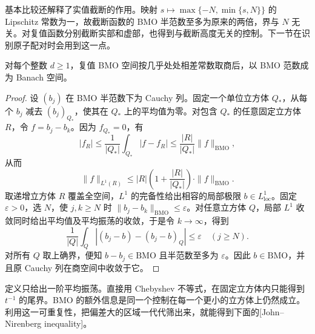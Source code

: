 \ProseParagraphBreak

基本比较还解释了实值截断的作用。映射 \(s\mapsto\max\{-N,\min\{s,N\}\}\) 的 Lipschitz 常数为一，故截断函数的 BMO 半范数至多为原来的两倍，界与 \(N\) 无关。对复值函数分别截断实部和虚部，也得到与截断高度无关的控制。下一节在识别原子配对时会用到这一点。

\begin{proposition}[模常数后的完备性]\label{b2:prop:C-bmo-complete}
对每个整数 \(d\geq1\)，复值 BMO 空间按几乎处处相差常数取商后，以 BMO 范数成为 Banach 空间。
\end{proposition}
\begin{proof}
设 \((b_j)\) 在 BMO 半范数下为 Cauchy 列。固定一个单位立方体 \(Q_*\)，从每个 \(b_j\) 减去 \((b_j)_{Q_*}\)，使其在 \(Q_*\) 上的平均值为零。对包含 \(Q_*\) 的任意固定立方体 \(R\)，令 \(f=b_j-b_k\)。因为 \(f_{Q_*}=0\)，有
\[
 |f_R|\leq\frac1{|Q_*|}\int_{Q_*}|f-f_R|
 \leq\frac{|R|}{|Q_*|}\|f\|_{\mathrm{BMO}},
\]
从而
\[
 \|f\|_{L^1(R)}
 \leq |R|\left(1+\frac{|R|}{|Q_*|}\right)
       \cdot\|f\|_{\mathrm{BMO}}.
\]
取递增立方体 \(R\) 覆盖全空间，\(L^1\) 的完备性给出相容的局部极限 \(b\in L^1_{\mathrm{loc}}\)。固定 \(\varepsilon>0\)，选 \(N\)，使 \(j,k\geq N\) 时 \(\|b_j-b_k\|_{\mathrm{BMO}}\leq\varepsilon\)。对任意立方体 \(Q\)，局部 \(L^1\) 收敛同时给出平均值及平均振荡的收敛，于是令 \(k\to\infty\)，得到
\[
 \frac1{|Q|}\int_Q|(b_j-b)-(b_j-b)_Q|\leq\varepsilon
 \quad(j\geq N).
\]
对所有 \(Q\) 取上确界，便知 \(b-b_j\in\mathrm{BMO}\) 且半范数至多为 \(\varepsilon\)。因此 \(b\in\mathrm{BMO}\)，并且原 Cauchy 列在商空间中收敛于它。
\end{proof}
定义只给出一阶平均振荡。直接用 Chebyshev 不等式，在固定立方体内只能得到 \(t^{-1}\) 的尾界。BMO 的额外信息是同一个控制在每一个更小的立方体上仍然成立。利用这一可重复性，把偏差大的区域一代代筛出来，就能得到下面的[John--Nirenberg inequality]。

